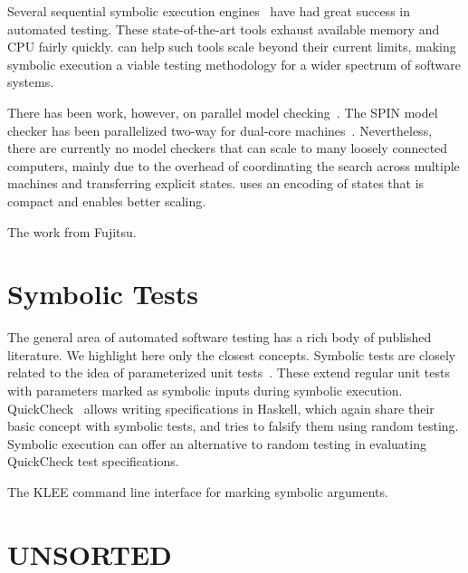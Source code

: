 Several sequential symbolic execution engines~\cite{godefroid:fuzz,dart,hct,klee} have had great success in automated testing. These state-of-the-art tools exhaust available memory and CPU fairly quickly.  \cnine can help such tools scale beyond their current limits, making symbolic execution a viable testing methodology for a wider spectrum of software systems.

There has been work, however, on parallel model checking~\cite{parallelMurphi,distributed-spin,loadBalModelchecking,spin:multicore-modelchecking,modelCheckBDD}. The SPIN model checker has been parallelized two-way for dual-core machines~\cite{parallelSPIN}. Nevertheless, there are currently no model checkers that can scale to many loosely connected computers, mainly due to the overhead of coordinating the search across multiple machines and transferring explicit states. \cnine uses an encoding of states that is compact and enables better scaling.

The work from Fujitsu.


\section{Symbolic Tests}

The general area of automated software testing has a rich body of published literature. We highlight here only the closest concepts. Symbolic tests are closely related to the idea of parameterized unit tests~\cite{tillmann-puts}. These extend regular unit tests with parameters marked as symbolic inputs during symbolic execution.
%
QuickCheck~\cite{quickcheck} allows writing specifications in Haskell, which again share their basic concept with symbolic tests, and tries to falsify them using random testing.  Symbolic execution can offer an alternative to random testing in evaluating QuickCheck test specifications.

The KLEE command line interface for marking symbolic arguments.


\section{UNSORTED}

